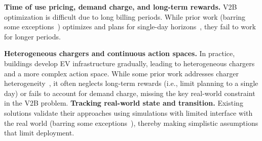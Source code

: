 \noindent\textbf{Time of use pricing, demand charge, and long-term rewards.} 
V2B optimization is difficult due to long billing periods. While prior work (barring some exceptions~\cite{9409126}) optimizes and plans for single-day horizons~\cite{AORC2013, MMN2019, SNDJ2020}, they fail to work for longer periods.

\noindent\textbf{Heterogeneous chargers and continuous action spaces.} 
In practice, buildings develop EV infrastructure gradually, leading to heterogeneous chargers and a more complex action space.
While some prior work addresses charger heterogeneity~\cite{NNM2024,ZJS2022}, it often neglects long-term rewards (i.e., limit planning to a single day) or fails to account for demand charge, missing the key real-world constraint in the V2B problem.
\noindent\textbf{Tracking real-world state and transition.}
Existing solutions validate their approaches using simulations with limited interface with the real world (barring some exceptions~\cite{9409126}), thereby making simplistic assumptions that limit deployment.




